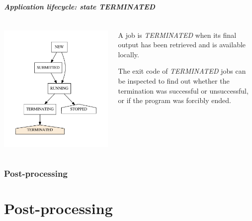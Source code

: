 \documentclass[english,serif,mathserif,xcolor=pdftex,dvipsnames,table]{beamer}
\begin{document}
\begin{frame}[fragile]
\frametitle{Application lifecycle: state TERMINATED}

\begin{columns}[c]
  \begin{column}{0.5\textwidth}
    \includegraphics[height=0.7\textheight]{fig/states-TERMINATED}
  \end{column}
  \begin{column}{0.5\textwidth}
    \raggedleft
    A job is \emph{TERMINATED} when its final output has been
    retrieved and is available locally.

    \+
    The exit code of \emph{TERMINATED} jobs can be inspected to
    find out whether the termination was successful or unsuccessful,
    or if the program was forcibly ended.
  \end{column}
\end{columns}
\end{frame}


\section{Post-processing}
\part{Post-processing}
\end{document}
